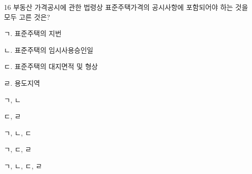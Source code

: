 \begin{question}{16}
부동산 가격공시에 관한 법령상 표준주택가격의 공시사항에 포함되어야 하는 것을 모두 고른 것은?
\begin{framedtext}
ㄱ. 표준주택의 지번 \par
ㄴ. 표준주택의 임시사용승인일 \par
ㄷ. 표준주택의 대지면적 및 형상 \par
ㄹ. 용도지역 \par
\end{framedtext}
\begin{choices}
  \item ㄱ, ㄴ
  \item ㄷ, ㄹ
  \item ㄱ, ㄴ, ㄷ
  \item ㄱ, ㄷ, ㄹ
  \item ㄱ, ㄴ, ㄷ, ㄹ
\end{choices}
\end{question}
